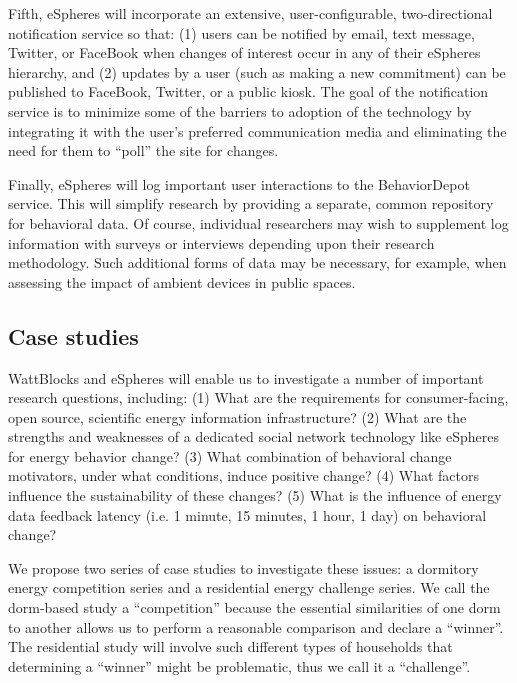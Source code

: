 Fifth, eSpheres will incorporate an extensive, user-configurable,
two-directional notification service so that: (1) users can be notified by
email, text message, Twitter, or FaceBook when changes of interest occur in
any of their eSpheres hierarchy, and (2) updates by a user (such as making
a new commitment) can be published to FaceBook, Twitter, or a public
kiosk. The goal of the notification service is to minimize some of the
barriers to adoption of the technology by integrating it with the user's
preferred communication media and eliminating the need for them to ``poll''
the site for changes.  

Finally, eSpheres will log important user interactions to the BehaviorDepot
service.  This will simplify research by providing a separate, common
repository for behavioral data.  Of course, individual researchers may wish
to supplement log information with surveys or interviews depending upon
their research methodology.  Such additional forms of data may be
necessary, for example, when assessing the impact of ambient devices in
public spaces.

\subsection{Case studies}

WattBlocks and eSpheres will enable us to investigate a number of
important research questions, including: (1) What are the requirements
for consumer-facing, open source, scientific energy information
infrastructure? (2) What are the strengths and weaknesses of a dedicated
social network technology like eSpheres for energy behavior change? (3)
What combination of behavioral change motivators, under what conditions,
induce positive change? (4) What factors influence the sustainability of
these changes? (5) What is the influence of energy data feedback latency
(i.e. 1 minute, 15 minutes, 1 hour, 1 day) on behavioral change? 

We propose two series of case studies to investigate these issues:
a dormitory energy competition series and a residential energy challenge
series.  We call the dorm-based study a ``competition'' because the
essential similarities of one dorm to another allows us to perform a
reasonable comparison and declare a ``winner''.  The residential study will
involve such different types of households that determining a ``winner''
might be problematic, thus we call it a ``challenge''.  

